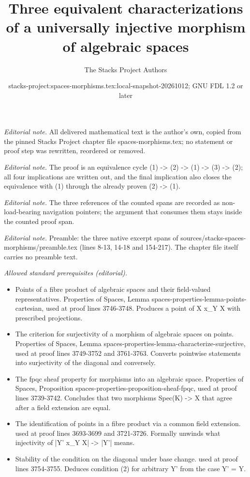 \documentclass[10pt,a4paper]{amsart}
\title{Three equivalent characterizations of a universally injective morphism of algebraic spaces}
\author{The Stacks Project Authors}
\date{stacks-project:spaces-morphisms.tex:local-snapshot-20261012; GNU FDL 1.2 or later}
\theoremstyle{plain}
\theoremstyle{definition}
\theoremstyle{remark}
\numberwithin{equation}{subsection}
\begin{document}
\maketitle
\setcounter{subsection}{1}
\noindent\textit{Editorial note.} All delivered mathematical text is the author's own, copied from the pinned Stacks Project chapter file spaces-morphisms.tex; no statement or proof step was rewritten, reordered or removed.\par\medskip
\noindent\textit{Editorial note.} The proof is an equivalence cycle (1) -> (2) -> (1) -> (3) -> (2); all four implications are written out, and the final implication also closes the equivalence with (1) through the already proven (2) -> (1).\par\medskip
\noindent\textit{Editorial note.} The three references of the counted spans are recorded as non-load-bearing navigation pointers; the argument that consumes them stays inside the counted proof span.\par\medskip
\noindent\textit{Editorial note.} Preamble: the three native excerpt spans of sources/stacks-spaces-morphisms/preamble.tex (lines 8-13, 14-18 and 154-217). The chapter file itself carries no preamble text.\par\medskip
\noindent\textit{Allowed standard prerequisites (editorial).}\begin{itemize}
\item Points of a fibre product of algebraic spaces and their field-valued representatives. Properties of Spaces, Lemma spaces-properties-lemma-points-cartesian, used at proof lines 3746-3748. Produces a point of X x\_Y X with prescribed projections.
\item The criterion for surjectivity of a morphism of algebraic spaces on points. Properties of Spaces, Lemma spaces-properties-lemma-characterize-surjective, used at proof lines 3749-3752 and 3761-3763. Converts pointwise statements into surjectivity of the diagonal and conversely.
\item The fpqc sheaf property for morphisms into an algebraic space. Properties of Spaces, Proposition spaces-properties-proposition-sheaf-fpqc, used at proof lines 3739-3742. Concludes that two morphisms Spec(K) -> X that agree after a field extension are equal.
\item The identification of points in a fibre product via a common field extension. used at proof lines 3693-3699 and 3721-3726. Formally unwinds what injectivity of |Y' x\_Y X| -> |Y'| means.
\item Stability of the condition on the diagonal under base change. used at proof lines 3754-3755. Deduces condition (2) for arbitrary Y' from the case Y' = Y.
\end{itemize}\medskip
\end{document}

